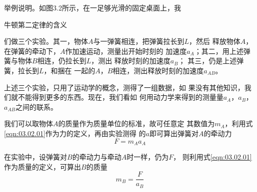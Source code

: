 举例说明。如图3.2所示，在一足够光滑的固定桌面上，我
\begin{figurex}[!h]
    \centering
    \hfill
    \hfill
    \hfill
    \hfill
    \label{fig:03.02}
    \caption{牛顿第二定律的含义}
\end{figurex}
\clearpage
\noindent 们做三个实验。其一，物体$ A $与一弹簧相连，把弹簧拉长到$ L $，然后
释放物体$ A $，在弹簧的牵动下，$ A $作加速运动，测量出开始时刻的
加速度$ a_A $；其二，用上述弹簧与物体$ B $相连，仍拉长到$ L $，测出
释放时刻的加速度$  a _ { B  } $；  其三，仍是上述弹簧，拉长到$ L $，和捆在
一起的$ A $，$ B $相连，测出释放时刻的加速度$  a _ { A B }  $。

上述三个实验，只用了运动学的概念，测得了一组数据，如
果没有其他知识，我们就不能得到更多的东西。现在，我们看如
何用动力学来得到的测量量$ a_A $，$ a_B $，$ a_{AB} $之间的联系。

我们可以取物体$ A $的质量作为质量单位的标准，故可任意定
其数值为$ m_A $，利用式\eqref{eqn:03.02.01}作为力的定义，再由实验测得
的$ a $即可算出弹簧对$ A $的牵动力
\begin{equation}\label{eqn:03.02.02}
    F = m _ { A } a _ { A }
\end{equation}

在实验中，设弹簧对$ B $的牵动力与牵动$ A $时一样，仍为$ F $，
则利用式\eqref{eqn:03.02.01}作为质量的定义，可算出$ B $的质量
\begin{equation}\label{eqn:03.02.03}
    m _ { B } = \frac { F } { a _ { B } }
\end{equation}

